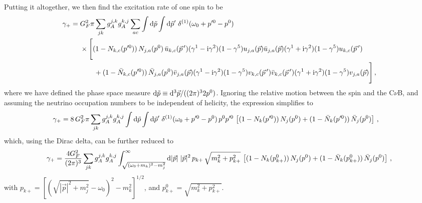 \documentclass[aps,prd,10pt,twocolumn,superscriptaddress,floatfix,nofootinbib,amsmath,amssymb,altaffilletter,preprintnumbers]{revtex4-1}
\begin{document}
Putting it altogether, we then find the excitation rate of one spin to be
\begin{equation}
\begin{aligned}
\gamma_{+}= & \; G_F^2\pi \sum_{jk} g_A^{j,k} g_A^{k,j} \sum_{ac}  
    \int {\rm d} \tilde{p} \int {\rm d} \tilde{p}' \; \delta^{(1)}(\omega_0+p'^0-p^0) \\
  &\; \times \Bigg[(1-N_{k,c}(p'^0)) \, N_{j,a}(p^0)\, \bar{u}_{k,c}(\vec{p}\,') (\gamma^1- {\rm i} \gamma^2)(1-\gamma^5) u_{j,a}(\vec{p}) 
    \bar{u}_{j,a}(\vec{p}) (\gamma^1+ {\rm i} \gamma^2)(1-\gamma^5) u_{k,c}(\vec{p}\,') \\
&\; \qquad +(1-\bar{N}_{k,c}(p'^0))\, \bar{N}_{j,a}(p^0)\bar{v}_{j,a}(\vec{p}) (\gamma^1- {\rm i} \gamma^2)(1-\gamma^5) v_{k,c}(\vec{p}\,') \bar{v}_{k,c}(\vec{p}\,') (\gamma^1+ {\rm i} \gamma^2)(1-\gamma^5) v_{j,a}(\vec{p})  \Bigg]\,,
    \label{eq:rate1heuristic}
    \end{aligned}
\end{equation}
where we have defined the phase space measure ${\rm d} \tilde{p} \equiv {\rm d}^3\vec{p}/((2 \pi)^3 2 p^0)$.  Ignoring the relative motion between the spin and the C$\nu$B, and assuming the neutrino occupation numbers to be independent of helicity, the expression simplifies to 
\begin{equation}
\begin{aligned}
\gamma_{+}= & \;8  \, G_F^2 \pi \sum_{jk} g_A^{j,k} g_A^{k,j} 
    \int {\rm d} \tilde{p} \int {\rm d} \tilde{p}' \; \delta^{(1)}(\omega_0+p'^0-p^0) \, p^0 p'^0\, \left[(1-N_{k}(p'^0)) \, N_{j}(p^0)  +(1-\bar{N}_{k}(p'^0))\, \bar{N}_{j}(p^0)\right]\,,
    \end{aligned}
\end{equation}
which, using the Dirac delta, can be further reduced to 
\begin{equation}
    \gamma_{+}= \frac{4G_F^2}{(2 \pi)^3} \sum_{jk} g_A^{j,k} g_A^{k,j}  
    \int_{\sqrt{(\omega_0+m_k)^2-m_j^2}}^\infty  {\rm d} |\vec{p}|\;|\vec{p}|^2\, p_{k+}\, \sqrt{m_k^2+p^2_{k+}} \,  
    \left[(1-N_{k}(p^0_{k+})) \, N_{j}(p^0)  +(1-\bar{N}_{k}(p^0_{k+}))\, \bar{N}_{j}(p^0)\right]\,,
    \label{eq:gamma+heuristic}
\end{equation}
with $p_{k+}=[(\sqrt{|\vec{p}|^2+m_j^2}-\omega_0)^2-m_k^2]^{1/2}$, and  $p^0_{k+}=\sqrt{m_k^2+p^2_{k+}}$.
\end{document}

